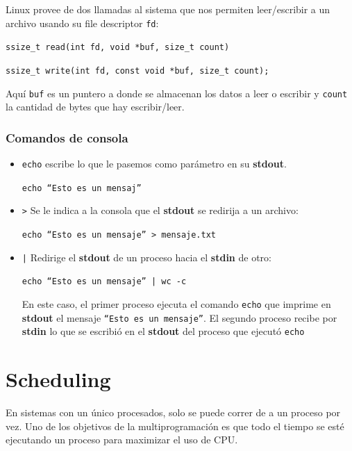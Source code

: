 	Linux provee de dos llamadas al sistema que nos permiten leer/escribir a un archivo usando su file descriptor \texttt{fd}:
	
	\begin{center}
		\texttt{ssize\_t read(int fd, void *buf, size\_t count)}

		\texttt{ssize\_t write(int fd, const void *buf, size\_t count);}
	\end{center}
	
Aquí \texttt{buf} es un puntero a donde se almacenan los datos a leer o escribir y \texttt{count} la cantidad de bytes que hay escribir/leer.

\subsubsection{Comandos de consola}
\begin{itemize}
	\item \texttt{echo} escribe lo que le pasemos como parámetro en su \textbf{stdout}.
	\begin{center}
		\texttt{echo ``Esto es un mensaj''}	\end{center}
	\item \texttt{>} Se le indica a la consola que el \textbf{stdout} se redirija a un archivo:
	\begin{center}
		\texttt{echo ``Esto es un mensaje'' > mensaje.txt}
	\end{center}
	\item \texttt{|} Redirige el \textbf{stdout} de un proceso hacia el \textbf{stdin} de otro:
	
	\begin{center}
		\texttt{echo ``Esto es un mensaje'' | wc -c}
	\end{center}

	En este caso, el primer proceso ejecuta el comando \texttt{echo} que imprime en \textbf{stdout} el mensaje \texttt{``Esto es un mensaje''}. El segundo proceso recibe por \textbf{stdin} lo que se escribió en el \textbf{stdout} del proceso que ejecutó \texttt{echo}
\end{itemize}
  
\newpage
	
\section{Scheduling} 
	En sistemas con un único procesados, solo se puede correr de a un proceso por vez. Uno de los objetivos de la multiprogramación es que todo el tiempo se esté ejecutando un proceso para maximizar el uso de CPU.
	
